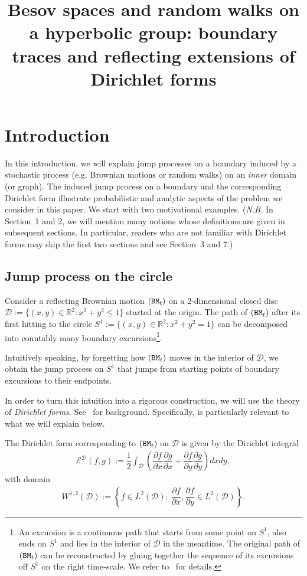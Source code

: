 \documentclass[AHL,Unicode,longabstracts,published]{cedram}
\title[Besov spaces and random walks]{Besov spaces and random walks on a hyperbolic group: boundary traces and reflecting extensions of Dirichlet forms}
\author[\initial{P.} \lastname{Mathieu}]{\firstname{Pierre} \lastname{Mathieu}}
\author[\initial{Y.} \lastname{Tokushige}]{\firstname{Yuki} \lastname{Tokushige}}
\newcommand{\ce}{\mathcal{E}}
\newcommand{\cd}{\mathcal{D}}
\newcommand{\br}{\mathbb{R}}
\begin{document}
\maketitle



\section{Introduction}\label{intro}
In this introduction, we will explain jump processes on a boundary induced by a stochastic process (e.g. Brownian motions or random walks) on an \emph{inner} domain (or graph). The induced jump process on a boundary and the corresponding Dirichlet form illustrate probabilistic and analytic aspects of the problem we consider in this paper. We start with two motivational examples. (\emph{N.B.} In Section~1 and 2, we will mention many notions whose definitions are given in subsequent sections. In particular, readers who are not familiar with Dirichlet forms may skip the first two sections and see Section~3 and 7.)



\subsection*{Jump process on the circle} Consider a reflecting Brownian motion $({\tt BM}_t)$ on a 2-dimensional closed disc $\cd:=\{(x,y)\in\br^2:x^2+y^2\leq1\}$ started at the origin. The path of $({\tt BM}_t)$ after its first hitting to the circle $S^1:=\{(x,y)\in\br^2:x^2+y^2=1\}$ can be decomposed into countably many boundary excursions\footnote{ An excursion is a continuous path that starts from some point on $S^1$, also ends on $S^1$ and lies in the interior of $\cd$ in the meantime. The original path of $({\tt BM}_t)$ can be reconstructed by gluing together the sequence of its excursions off $S^1$ on the right time-scale. We refer to~\cite{Bu} for details.}.


Intuitively speaking, by forgetting how $({\tt BM}_t)$ moves in the interior of $\cd$, we obtain the jump process on $S^1$ that jumps from starting points of boundary excursions to their endpoints.

In order to turn this intuition into a rigorous construction, we will use the theory of \emph{Dirichlet forms}. See~\cite{CF,FOT} for background. Specifically, \cite[Example~1.2.3]{FOT} is particularly relevant to what we will explain below.

The Dirichlet form corresponding to $({\tt BM}_t)$ on $\cd$ is given by the Dirichlet integral
\begin{align*}
\ce^\cd(f,g):=\dfrac{1}{2}\int_\cd\left(\dfrac{\partial f}{\partial x}\dfrac{\partial g}{\partial x}+\dfrac{\partial f}{\partial y}\dfrac{\partial g}{\partial y}\right)dxdy,
\end{align*}
with domain
\begin{align*}
W^{1,2}(\cd):=\left\{f\in L^2(\cd):\ \dfrac{\partial f}{\partial x},\dfrac{\partial f}{\partial y}\in L^2(\cd)\right\}.
\end{align*}
\end{document}
